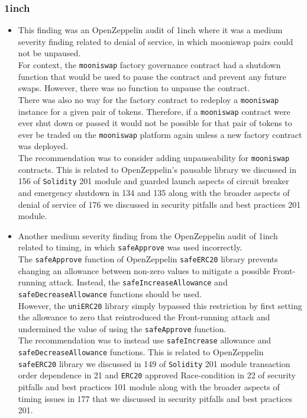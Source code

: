 \subsubsection{1inch}\label{inch}

\begin{itemize}
\item
  This finding was an OpenZeppelin audit of 1inch where it was a medium
  severity finding related to denial of service, in which mooniswap
  pairs could not be unpaused.\\

  For context, the \texttt{mooniswap} factory governance contract had a
  shutdown function that would be used to pause the contract and prevent
  any future swaps. However, there was no function to unpause the
  contract.\\

  There was also no way for the factory contract to redeploy a
  \texttt{mooniswap} instance for a given pair of tokens. Therefore, if
  a \texttt{mooniswap} contract were ever shut down or passed it would
  not be possible for that pair of tokens to ever be traded on the
  \texttt{mooniswap} platform again unless a new factory contract was
  deployed.\\

  The recommendation was to consider adding unpauseability for
  \texttt{mooniswap} contracts. This is related to OpenZeppelin's
  pausable library we discussed in 156 of \texttt{Solidity} 201 module
  and guarded launch aspects of circuit breaker and emergency shutdown
  in 134 and 135 along with the broader aspects of denial of service of
  176 we discussed in security pitfalls and best practices 201 module.
\item
  Another medium severity finding from the OpenZeppelin audit of 1inch
  related to timing, in which \texttt{safeApprove} was used
  incorrectly.\\

  The \texttt{safeApprove} function of OpenZeppelin \texttt{safeERC20}
  library prevents changing an allowance between non-zero values to
  mitigate a possible Front-running attack. Instead, the
  \texttt{safeIncreaseAllowance} and \texttt{safeDecreaseAllowance}
  functions should be used.\\

  However, the \texttt{uniERC20} library simply bypassed this
  restriction by first setting the allowance to zero that reintroduced
  the Front-running attack and undermined the value of using the
  \texttt{safeApprove} function.\\

  The recommendation was to instead use \texttt{safeIncrease} allowance
  and \texttt{safeDecreaseAllowance} functions. This is related to
  OpenZeppelin \texttt{safeERC20} library we discussed in 149 of
  \texttt{Solidity} 201 module transaction order dependence in 21 and
  \texttt{ERC20} approved Race-condition in 22 of security pitfalls and
  best practices 101 module along with the broader aspects of timing
  issues in 177 that we discussed in security pitfalls and best
  practices 201.
\end{itemize}

